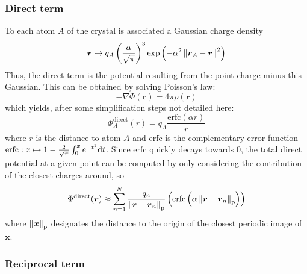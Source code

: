 \documentclass[main.tex]{subfiles}
\begin{document}
\subsubsection{Direct term}

To each atom $A$ of the crystal is associated a Gaussian charge density
\[\boldsymbol r\mapsto q_A\left(\frac\alpha{\sqrt\pi}\right)^3\exp\left(-\alpha^2\left\|\boldsymbol r_A - \boldsymbol r\right\|^2\right)\label{gaussian_charge}\]
Thus, the direct term is the potential resulting from the point charge minus this Gaussian. This can be obtained by solving Poisson's law:
\[-\nabla\Phi(\boldsymbol r) = 4\pi\rho(\boldsymbol r)\label{Poisson}\]
which yields, after some simplification steps not detailed here:
\[\Phi^\text{direct}_A(r) = q_A\frac{\text{erfc}(\alpha r)}r\]
where $r$ is the distance to atom $A$ and $\text{erfc}$ is the complementary error function $\text{erfc}:x\mapsto 1 - \frac2{\sqrt\pi}\int_0^xe^{-t^2}\text dt$. Since $\text{erfc}$ quickly decays towards $0$, the total direct potential at a given point can be computed by only considering the contribution of the closest charges around, so
\[\Phi^\text{direct}(\boldsymbol r) \approx \sum_{n=1}^N \frac{q_n}{\left\|\boldsymbol r - \boldsymbol r_n\right\|_\text{p}}\left(\text{erfc}\left(\alpha \left\|\boldsymbol r - \boldsymbol r_n\right\|_\text{p}\right)\right)\]
where $\left\|\boldsymbol x\right\|_\text{p}$ designates the distance to the origin of the closest periodic image of $\boldsymbol x$.

\subsubsection{Reciprocal term}
\end{document}
